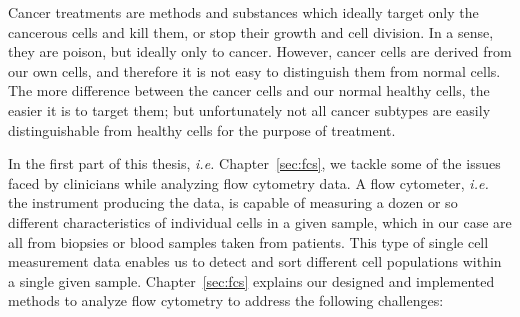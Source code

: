 Cancer treatments are methods and substances which ideally target only the
cancerous cells and kill them, or stop their growth and cell division. In a
sense, they are poison, but ideally only to cancer. However, cancer cells are
derived from our own cells, and therefore it is not easy to distinguish them
from normal cells. The more difference between the cancer cells and our normal
healthy cells, the easier it is to target them; but unfortunately not all
cancer subtypes are easily distinguishable from healthy cells for the purpose
of treatment.

In the first part of this thesis, \emph{i.e.} Chapter~\ref{sec:fcs}, we tackle
some of the issues faced by clinicians while analyzing flow cytometry data. A
flow cytometer, \emph{i.e.} the instrument producing the data, is capable of
measuring a dozen or so different characteristics of individual cells in a
given sample, which in our case are all from biopsies or blood samples taken
from patients. This type of single cell measurement data enables us to detect
and sort different cell populations within a single given sample.
Chapter~\ref{sec:fcs} explains our designed and implemented methods to analyze
flow cytometry to address the following challenges:

